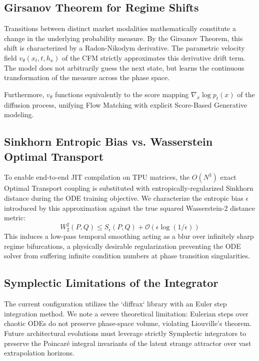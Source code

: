 \documentclass[11pt]{article}
\begin{document}
\subsection{Girsanov Theorem for Regime Shifts}
Transitions between distinct market modalities mathematically constitute a change in the underlying probability measure. By the Girsanov Theorem, this shift is characterized by a Radon-Nikodym derivative. The parametric velocity field $v_\theta(x_t, t, h_x)$ of the CFM strictly approximates this derivative drift term. The model does not arbitrarily guess the next state, but learns the continuous transformation of the measure across the phase space.

Furthermore, $v_\theta$ functions equivalently to the score mapping $\nabla_x \log p_t(x)$ of the diffusion process, unifying Flow Matching with explicit Score-Based Generative modeling.

\subsection{Sinkhorn Entropic Bias vs. Wasserstein Optimal Transport}
To enable end-to-end JIT compilation on TPU matrices, the $O(N^3)$ exact Optimal Transport coupling is substituted with entropically-regularized Sinkhorn distance \cite{cuturi2013sinkhorn} during the ODE training objective. 
We characterize the entropic bias $\epsilon$ introduced by this approximation against the true squared Wasserstein-2 distance metric:
\begin{equation}
  W_2^2(P, Q) \le S_\epsilon(P, Q) + \mathcal{O}(\epsilon \log(1/\epsilon))
\end{equation}
This induces a low-pass temporal smoothing acting as a blur over infinitely sharp regime bifurcations, a physically desirable regularization preventing the ODE solver from suffering infinite condition numbers at phase transition singularities.

\subsection{Symplectic Limitations of the Integrator}
The current configuration utilizes the `diffrax` library with an Euler step integration method. We note a severe theoretical limitation: Eulerian steps over chaotic ODEs do not preserve phase-space volume, violating Liouville's theorem. Future architectural evolutions must leverage strictly Symplectic integrators to preserve the Poincaré integral invariants of the latent strange attractor over vast extrapolation horizons.
\end{document}
